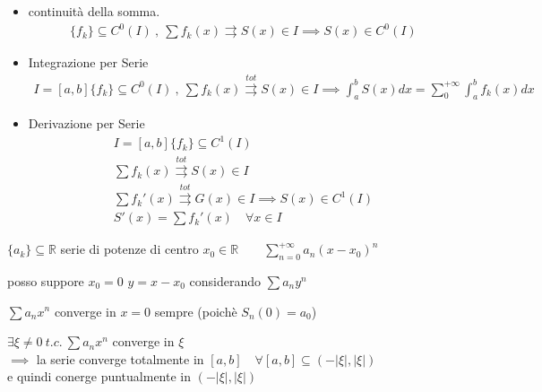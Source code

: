\documentclass[a4paper, oneside]{article}
\begin{document}
\begin{theorem}
  \begin{itemize}
    \hfil\\
    \item continuità della somma.
    \begin{gather*}
      \{f_k\} \subseteq C^0(I) \ , \ \sum f_k(x) \rightrightarrows S(x) \in I \implies S(x) \in C^0(I)
    \end{gather*}
    \item Integrazione per Serie
    \begin{gather*}
      I = [a,b] \{f_k\} \subseteq C^0(I) \ , \ \sum f_k(x) \overset{tot}{\rightrightarrows} S(x) \in I \implies \int_a^b S(x) dx = \sum_0^{+\infty} \int_a^b f_k(x) dx
    \end{gather*}
    \item Derivazione per Serie
    \begin{gather*}
      I = [a,b] \{f_k\} \subseteq C^1(I) \\ \sum f_k(x) \overset{tot}{\rightrightarrows} S(x) \in I \\ \sum f_k'(x) \overset{tot}{\rightrightarrows} G(x) \in I \implies S(x) \in C^1(I) \\ S'(x) = \sum f_k'(x) \quad \forall x \in I
    \end{gather*}
  \end{itemize}
\end{theorem}


\begin{definition}
  $\{a_k\} \subseteq \mathbb{R}$ serie di potenze di centro $x_0 \in \mathbb{R} \qquad \sum_{n=0}^{+\infty} a_n (x - x_0)^n$
\end{definition}


\begin{observation}
  posso suppore $x_0=0$ $y=x-x_0$ considerando $\sum a_n y^n$
\end{observation}


\begin{observation}
  $\sum a_n x^n$ converge in $x=0$ \small sempre (poichè $S_n(0) = a_0$)\normalsize
\end{observation}


\begin{theorem}
   $\exists \xi \neq 0 \ t.c. \ \sum a_n x^n $ converge in $\xi$\\
  $\implies$ la serie converge totalmente in $[a,b] \quad \forall [a,b] \subseteq (-|\xi|, |\xi|)$\\
  e quindi conerge puntualmente in $(-|\xi|, |\xi|)$
\end{theorem}
\end{document}
